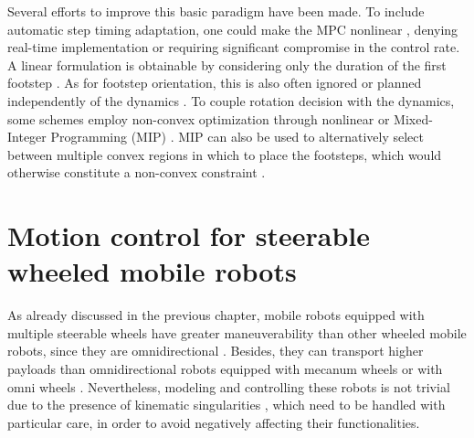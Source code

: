Several efforts to improve this basic paradigm have been made. To include automatic step timing adaptation, one could make the MPC nonlinear \cite{Maximo2020MIQPAutomaticWalking,Bohorquez2017AdaptiveStepDuration,Caron2017Whentomakeastep,Aurelien2014IROS}, denying real-time implementation or requiring significant compromise in the control rate. A linear formulation is obtainable by considering only the duration of the first footstep \cite{Smaldone2021FeasibilityDrivenSTA,Khadiv2020StepTimingAdaptation}. As for footstep orientation, this is also often ignored or planned independently of the dynamics \cite{Herdt2010IROS}. To couple rotation decision with the dynamics, some schemes employ non-convex optimization through nonlinear \cite{Naveau2017RAL,Bohorquez2018AdaptiveStepRotation} or Mixed-Integer Programming (MIP) \cite{Maximo2020MIQPAutomaticWalking}. MIP can also be used to alternatively select between multiple convex regions in which to place the footsteps, which would otherwise constitute a non-convex constraint \cite{Aceituno2018RAL,Deits2014FootstepPlanningMIQCQP}.


\section{Motion control for steerable wheeled mobile robots}
As already discussed in the previous chapter, mobile robots equipped with
multiple steerable wheels
have greater maneuverability than other wheeled mobile robots, since they are
omnidirectional \cite{RobuffoGiordano2009ICRA}. Besides, they can transport
higher payloads than omnidirectional robots equipped with mecanum wheels
\cite{Dickerson1991ControlOminidirectionalRobotwithMecaumWheels} or
with omni wheels \cite{Blumrich1974OmnidirectionalWheel}.
Nevertheless, modeling and controlling these robots is not
trivial due to the presence of kinematic singularities \cite{Sorour2017RAL},
which need to be handled with particular care, in order to avoid negatively
affecting their functionalities.


